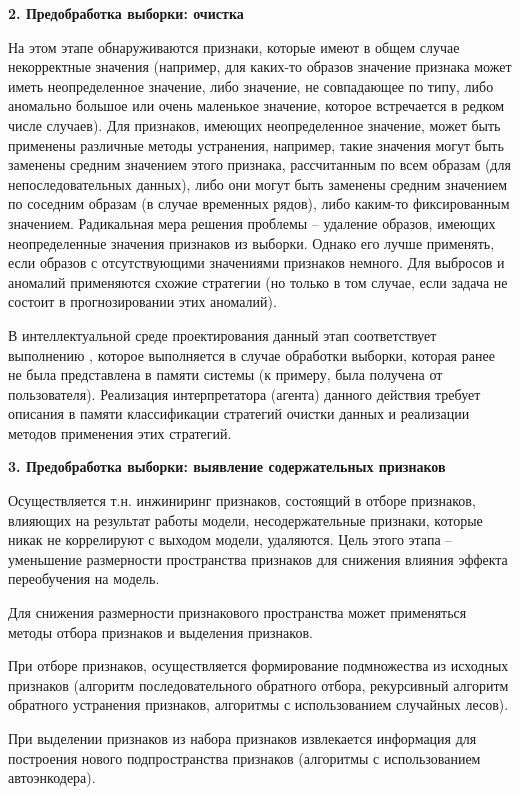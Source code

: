 \textbf{2. Предобработка выборки: очистка}

На этом этапе обнаруживаются признаки, которые имеют в общем случае некорректные значения (например, для каких-то образов значение признака может иметь неопределенное значение, либо значение, не совпадающее по типу, либо аномально большое или очень маленькое значение, которое встречается в редком числе случаев). Для признаков, имеющих неопределенное значение, может быть применены различные методы устранения, например, такие значения могут быть заменены средним значением этого признака, рассчитанным по всем образам (для непоследовательных данных), либо они могут быть заменены средним значением по соседним образам (в случае временных рядов), либо каким-то фиксированным значением. Радикальная мера решения проблемы -- удаление образов, имеющих неопределенные значения признаков из выборки. Однако его лучше применять, если образов с отсутствующими значениями признаков немного. Для выбросов и аномалий применяются схожие стратегии (но только в том случае, если задача не состоит в прогнозировании этих аномалий).

В интеллектуальной среде проектирования данный этап соответствует выполнению , которое выполняется в случае обработки выборки, которая ранее не была представлена в памяти системы (к примеру, была получена от пользователя).
Реализация интерпретатора (агента) данного действия требует описания в памяти классификации стратегий очистки данных и реализации методов применения этих стратегий.


\textbf{3. Предобработка выборки: выявление содержательных признаков}

Осуществляется т.н. инжиниринг признаков, состоящий в отборе признаков, влияющих на результат работы модели, несодержательные признаки, которые никак не коррелируют с выходом модели, удаляются. Цель этого этапа -- уменьшение размерности пространства признаков для снижения влияния эффекта переобучения на модель.

Для снижения размерности признакового пространства может применяться методы отбора признаков и выделения признаков.

При отборе признаков, осуществляется формирование подмножества из исходных признаков (алгоритм последовательного обратного отбора, рекурсивный алгоритм обратного устранения признаков,  алгоритмы с использованием случайных лесов).

При выделении признаков из набора признаков извлекается информация для построения нового подпространства признаков (алгоритмы с использованием автоэнкодера).

